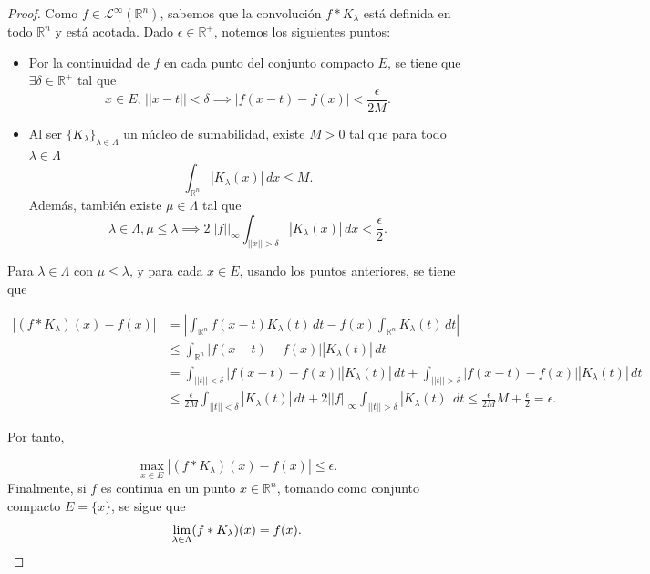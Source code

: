 \begin{proof}
    Como $f \in \mathscr{L}^{\infty}(\mathbb{R}^n)$, sabemos que la convolución $f*K_\lambda$ está definida en todo $\mathbb{R}^n$ y está acotada. Dado $\epsilon \in \mathbb{R}^+$, notemos los siguientes puntos: 
    \begin{itemize}
    
        \item Por la continuidad de $f$ en cada punto del conjunto compacto $E$, se tiene que $\exists \delta \in \mathbb{R}^+$ tal que 
        \begin{equation}
            x \in E, \, ||x-t||< \delta \implies |f(x-t)-f(x)| < \frac{\epsilon}{2M}.
        \end{equation}
        
        \item Al ser $\{K_{\lambda}\}_{\lambda \in \Lambda}$ un núcleo de sumabilidad, existe $ M >0$ tal que para todo $ \lambda \in \Lambda$
        \begin{equation}
             \int_{\mathbb{R}^n} |{K_\lambda}(x)| \, dx \leq M.
        \end{equation}
        Además, también existe $ \mu \in \Lambda$ tal que
        \begin{equation}
            \lambda \in \Lambda, \mu \leq \lambda \implies 2 ||f||_\infty   \int_{||x|| > \delta} |K_{\lambda}(x)|\, dx < \frac{\epsilon}{2}.
        \end{equation} 
    \end{itemize}

    \noindent Para $\lambda \in \Lambda$ con $ \mu \leq \lambda$, y para cada $x \in E$, usando los puntos anteriores, se tiene que
    
     \begin{align*}
        |(f*K_{\lambda})(x)-f(x)| &= \left|\int_{\mathbb{R}^n}f(x-t)K_{\lambda}(t) \, dt - f(x) \int_{\mathbb{R}^n}K_{\lambda}(t) \,dt \right| \\
        &\leq \int_{\mathbb{R}^n} \left|f(x-t)-f(x) \right| |K_{\lambda}(t)| \, dt \\
        &=   \int_{||t|| < \delta} \left|f(x-t)-f(x) \right| |K_{\lambda}(t)| \, dt + \int_{||t|| > \delta} \left|f(x-t)-f(x) \right| |K_{\lambda}(t)| \, dt \\ 
        &\leq \frac{\epsilon}{2M}\int_{||t|| < \delta}  |K_{\lambda}(t)| \, dt + 2 ||f||_\infty\int_{||t|| > \delta} |K_{\lambda}(t)| \, dt 
        \leq \frac{\epsilon}{2M}M + \frac{\epsilon}{2} = \epsilon.
    \end{align*}


    \noindent Por tanto,
    
    \begin{equation}
        \max_{x \in E} |(f*K_{\lambda})(x)-f(x)| \leq \epsilon.
    \end{equation}
    Finalmente, si $f$ es continua en un punto $x \in \mathbb{R}^n$, tomando como conjunto compacto $E = \{x\}$, se sigue que 
    \begin{equation*}\label{punt}
            \lim_{\lambda  \in \Lambda} (f*K_{\lambda})(x)=f(x).\qedhere
        \end{equation*}
\end{proof}


